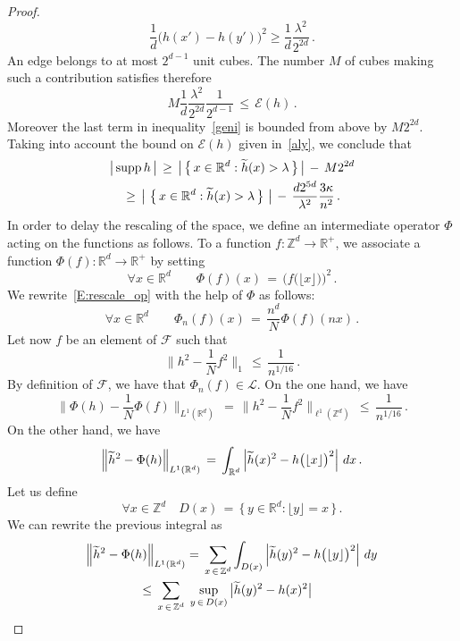 \documentclass[AHL, Unicode, longabstracts, published]{cedram}
\newcommand*\supp{\text{supp\,}}
\newcommand*\Zd {{\mathbb Z^d}}
\newcommand*\Rd {{\mathbb R^d}}
\newcommand*\R{\mathbb{R}}
\newcommand*\hht{\smash{\widetilde h}}
\newcommand{\cE}{\mathcal{E}}
\newcommand{\cF}{\mathcal{F}}
\newcommand{\cL}{\mathcal{L}}
\let\oldforall\forall
\renewcommand*{\forall}{\mathrel{\oldforall}}
\begin{document}
\begin{proof}
\[
\frac{1}{d}\big(h(x')-h(y')\big)^2\geq\frac{1}{d}\frac{\lambda^2}{2^{2d}}\,.
\]
An edge belongs to at most $2^{d-1}$ unit cubes. The number $M$ of cubes making such a contribution satisfies therefore
\[
M\frac{1}{d}\frac{\lambda^2}{2^{2d}}\frac{1}{2^{d-1}}\,\leq\,\cE(h)\,.
\]
Moreover the last term in inequality~\eqref{geni} is bounded from above by $M2^{2d}$. Taking into account the bound on $\cE(h)$ given in~\eqref{aly}, we conclude that
\begin{multline}\label{weni}
\big|\,\supp h\,\big|\,\geq\,
\left|\,\left\{\,x\in \Rd:\hht(x)>\lambda\,\right\}\,\right|\,-\, M2^{2d} \\
\,\geq\,
\big|\,\left\{\,x\in \Rd:\hht(x)>\lambda\,\right\}\,\big|\,-\,
\frac{d2^{5d}}{\lambda^2}
\frac{3\kappa}{n^2}\,.
\end{multline}
In order to delay the rescaling of the space, we define an intermediate operator $\Phi$ acting on the functions as follows. To a function $f:\Zd\to\R^+$, we associate a function $\Phi(f):\Rd\to\R^+$ by setting
\[
\forall x\in\Rd\qquad \Phi(f)(x)\,=\,
{\Big(f\big(\lfloor x\rfloor\big)\Big)^2}\,.
\]
We rewrite~\eqref{E:rescale_op} with the help of $\Phi$ as follows:
\begin{equation}\label{ggi}
\forall x\in\Rd\qquad \Phi_n(f)(x)\,=\,
\frac{n^d}{N}
\Phi(f)(nx)\,.
\end{equation}
Let now $f$ be an element of $\cF$ such that
\[
\Big\|h^2-\frac{1}{N}f^2\Big\|_{1}
\,\leq\,\frac{1}{n^{1/16}}\,.
\]
By definition of $\cF$, we have that $\Phi_n(f)\in\cL$. On the one hand, we have
\begin{equation}\label{zeni}
\Big\|\Phi(h)-
\frac{1}{N} \Phi(f)
\Big\|_{L^1(\Rd)}\,=\,
\Big\|h^2-\frac{1}{N}f^2\Big\|_{\ell^1(\Zd)}
\,\leq\,\frac{1}{n^{1/16}}\,.
\end{equation}
On the other hand, we have
\begin{equation}\label{beni}
\Big\|\hht^2-
\Phi(h)
\Big\|_{L^1(\Rd)}\,=\,
\int_{\Rd}\left|
\hht(x)^2- h\big(\lfloor x\rfloor\big)^2
\right|\,dx
\,.
\end{equation}
Let us define
\[
\forall x\in\Zd\quad D(x)\,=\,\big\{\,y\in \Rd:
\lfloor y\rfloor=x\,\big\}\,.
\]
We can rewrite the previous integral as
\begin{multline}\label{bvni}
\Big\|\hht^2- \Phi(h)
\Big\|_{L^1(\Rd)} =\,
\sum_{x\,\in\,\Zd}
\int_{D(x)}\left|
\hht(y)^2- h\big(\lfloor y\rfloor\big)^2
\right|\,dy\\
\begin{aligned}
&\leq\,
\sum_{x\,\in\,\Zd}\;
\sup_{y\,\in\,D(x)}\left|\hht(y)^2- h(x)^2\right|

\end{aligned}
\end{multline}
\end{proof}
\end{document}
